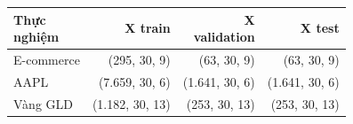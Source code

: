 \begin{tabular}{lrrr}
\toprule
\makecell[l]{Thực\\nghiệm} & X train & \makecell[r]{X\\validation} & X test \\
\midrule
E-commerce & (295, 30, 9) & (63, 30, 9) & (63, 30, 9) \\
AAPL & (7{.}659, 30, 6) & (1{.}641, 30, 6) & (1{.}641, 30, 6) \\
Vàng GLD & (1{.}182, 30, 13) & (253, 30, 13) & (253, 30, 13) \\
\bottomrule
\end{tabular}
